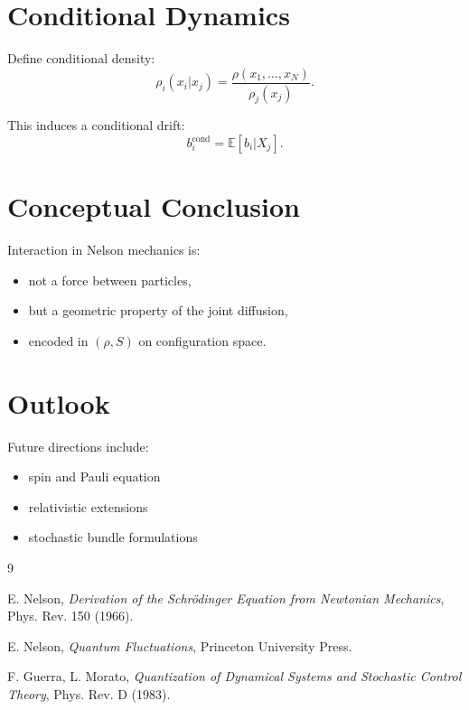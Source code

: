 \documentclass[11pt]{article}
\begin{document}
\section{Conditional Dynamics}

Define conditional density:
\begin{equation}
\rho_i(x_i | x_j) = \frac{\rho(x_1,\dots,x_N)}{\rho_j(x_j)}.
\end{equation}

This induces a conditional drift:
\begin{equation}
b_i^{\text{cond}} = \mathbb{E}[b_i | X_j].
\end{equation}

\section{Conceptual Conclusion}

Interaction in Nelson mechanics is:

\begin{itemize}
\item not a force between particles,
\item but a geometric property of the joint diffusion,
\item encoded in $(\rho,S)$ on configuration space.
\end{itemize}

\section{Outlook}

Future directions include:
\begin{itemize}
\item spin and Pauli equation
\item relativistic extensions
\item stochastic bundle formulations
\end{itemize}

\begin{thebibliography}{9}

E. Nelson,
\textit{Derivation of the Schr\"odinger Equation from Newtonian Mechanics},
Phys. Rev. 150 (1966).

E. Nelson,
\textit{Quantum Fluctuations},
Princeton University Press.

F. Guerra, L. Morato,
\textit{Quantization of Dynamical Systems and Stochastic Control Theory},
Phys. Rev. D (1983).

\end{thebibliography}
\end{document}
